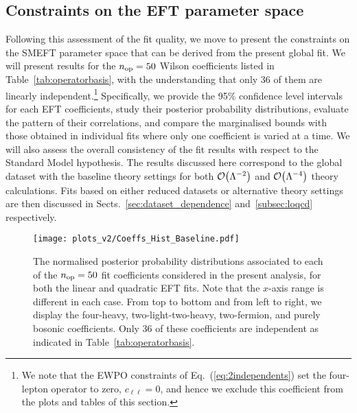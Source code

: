 \subsection{Constraints on the EFT parameter space}

Following this assessment of the fit quality,
we move to present the constraints on the SMEFT parameter space
that can be derived from the present global fit.
%
We will present results for the $n_{\rm op}=50$ Wilson
coefficients listed in Table~\ref{tab:operatorbasis},
with the understanding that only 36 of them are linearly
independent.\footnote{We note that the EWPO constraints of Eq.~(\ref{eq:2independents}) set
  the four-lepton operator to zero, $c_{\ell\ell}=0$, and hence we exclude this coefficient
from the plots and tables of this section.}
%
Specifically, we provide the 95\% confidence level intervals for each
EFT coefficients,
study their posterior probability distributions, evaluate the pattern
of their correlations, and compare the marginalised bounds with those
obtained in individual fits where only one coefficient is varied at a time.
%
We will also assess the overall consistency of the fit results with respect
to the Standard Model hypothesis.
%
The results discussed here correspond to the global dataset with the baseline theory
settings for both $\mathcal{O}\lp \Lambda^{-2}\rp$ and $\mathcal{O}\lp \Lambda^{-4}\rp$
theory calculations.
%
Fits based on either reduced datasets or alternative theory settings
are then discussed in Sects.~\ref{sec:dataset_dependence}
and~\ref{subsec:loqcd}  respectively.

\begin{figure}[t]
  \begin{center}
     \texttt{[image: plots\_v2/Coeffs\_Hist\_Baseline.pdf]}
    \caption{\small The normalised posterior probability distributions associated
      to each of the $n_{\rm op}=50$ fit coefficients considered in the present
      analysis, for both the linear and quadratic EFT fits.
      Note that the $x$-axis range is different in each case.
      From top to bottom and from left to right, we display
      the four-heavy, two-light-two-heavy,
      two-fermion, and purely bosonic coefficients.
      Only 36 of these coefficients are independent
      as indicated in Table~\ref{tab:operatorbasis}.
     \label{fig:posterior_coeffs} }
  \end{center}
\end{figure}


